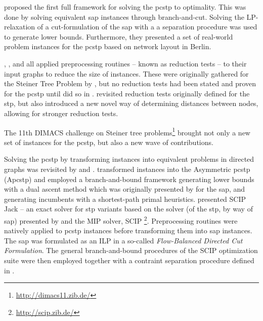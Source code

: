  \citet{ljubic2005solving} proposed the first full framework for solving the \gls{pcstp} to optimality.
 This was done by solving
 equivalent \gls{sap} instances through branch-and-cut. Solving the LP-relaxation of a cut-formulation of the \gls{sap} with a
 a separation procedure was used to generate lower bounds.
  Furthermore, they presented a set of real-world problem instances for the \gls{pcstp} based on network layout in Berlin.

  \citet{lucena2004strong}, \citet{Ljubic:2004:memetic}, and \citet{ljubic2005solving} all applied preprocessing routines
  -- known as reduction tests -- to their input graphs to reduce the size of instances.
  These were originally gathered for
  the Steiner Tree Problem by \citet{duin1989edge,duin1989reduction},
  but no reduction tests had been stated and proven for the \gls{pcstp}
  until \citeauthor{uchoa2006reduction} did so in \citeyear{uchoa2006reduction}.
  \citeauthor{uchoa2006reduction} revisited
  reduction tests originally defined for the \gls{stp},
  but also introduced a new
  novel way of determining distances between nodes,
  allowing for stronger reduction tests.

  The 11th DIMACS challenge on Steiner tree problems\footnote{\url{http://dimacs11.zib.de/}}
  brought not only a new set of instances for the \gls{pcstp}, but
  also a new wave of contributions.

  Solving the \gls{pcstp} by transforming instances into equivalent problems in directed graphs
  was revisited by \citet{leitner2016dual} and \citet{gamrath2017scip}.
  \citet{leitner2016dual} transformed instances into the Asymmetric \gls{pcstp} (A\gls{pcstp})
  and employed a
  branch-and-bound framework generating lower bounds with a dual ascent method which was originally presented by \citet{wong1984dual} for the \gls{sap}, and
  generating incumbents with
  a shortest-path primal heuristics.
  \citet{gamrath2017scip} presented SCIP Jack -- an exact solver for \gls{stp} variants based on the solver (of the \gls{stp}, by way of \gls{sap}) presented by
  \citet{koch1998solving} and the MIP solver, SCIP \footnote{\url{http://scip.zib.de/}}.
  Preprocessing routines were natively applied to \gls{pcstp} instances before transforming them into \gls{sap} instances.
  The \gls{sap} was formulated as an
  ILP in a so-called \textit{Flow-Balanced Directed Cut Formulation}. The general branch-and-bound
  procedures of the SCIP optimization suite were
  then employed together with a contraint separation procedure defined in \citet{koch1998solving}.

